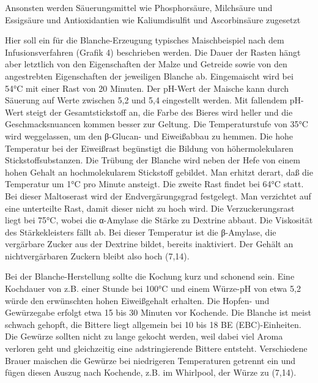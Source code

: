 \documentclass[a4paper,parskip=half]{scrartcl}
\begin{document}
\parencite[16]{Strottner1999}

Ansonsten werden Säuerungsmittel wie Phosphorsäure, Milchsäure und Essigsäure
und Antioxidantien wie Kaliumdisulfit und Ascorbinsäure zugesetzt

Hier soll ein für die Blanche-Erzeugung typisches Maischbeispiel nach dem
Infusionsverfahren (Grafik 4) beschrieben werden. Die Dauer der Rasten hängt aber
letztlich von den Eigenschaften der Malze und Getreide sowie von den angestrebten
Eigenschaften der jeweiligen Blanche ab.
Eingemaischt wird bei 54°C mit einer Rast von 20 Minuten. Der pH-Wert der Maische
kann durch Säuerung auf Werte zwischen 5,2 und 5,4 eingestellt werden. Mit
fallendem pH-Wert steigt der Gesamtstickstoff an, die Farbe des Bieres wird heller
und die Geschmacksnuancen kommen besser zur Geltung. Die Temperaturstufe von
35°C wird weggelassen, um den β-Glucan- und Eiweißabbau zu hemmen. Die hohe
Temperatur bei der Eiweißrast begünstigt die Bildung von höhermolekularen
Stickstoffsubstanzen. Die Trübung der Blanche wird neben der Hefe von einem
hohen Gehalt an hochmolekularem Stickstoff gebildet.
Man erhitzt derart, daß die Temperatur um 1°C pro Minute ansteigt.
Die zweite Rast findet bei 64°C statt. Bei dieser Maltoserast wird der
Endvergärungsgrad festgelegt. Man verzichtet auf eine unterteilte Rast, damit dieser
nicht zu hoch wird.
Die Verzuckerungsrast liegt bei 75°C, wobei die α-Amylase die Stärke zu Dextrine
abbaut. Die Viskosität des Stärkekleisters fällt ab. Bei dieser Temperatur ist die
β-Amylase, die vergärbare Zucker aus der Dextrine bildet, bereits inaktiviert. Der
Gehält an nichtvergärbaren Zuckern bleibt also hoch (7,14).

\parencite[17]{Strottner1999}


Bei der Blanche-Herstellung sollte die Kochung kurz und schonend sein. Eine
Kochdauer von z.B. einer Stunde bei 100°C und einem Würze-pH von etwa 5,2
würde den erwünschten hohen Eiweißgehalt erhalten.
Die Hopfen- und Gewürzegabe erfolgt etwa 15 bis 30 Minuten vor Kochende. Die
Blanche ist meist schwach gehopft, die Bittere liegt allgemein bei 10 bis 18 BE
(EBC)-Einheiten.
Die Gewürze sollten nicht zu lange gekocht werden, weil dabei viel Aroma verloren
geht und gleichzeitig eine adstringierende Bittere entsteht. Verschiedene Brauer
maischen die Gewürze bei niedrigeren Temperaturen getrennt ein und fügen diesen
Auszug nach Kochende, z.B. im Whirlpool, der Würze zu (7,14).

\parencite[18]{Strottner1999}
\end{document}
